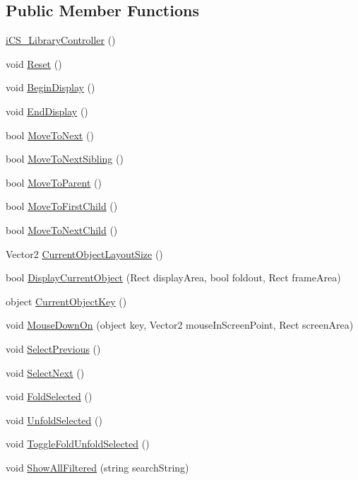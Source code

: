 \subsection*{Public Member Functions}
\begin{DoxyCompactItemize}
\item 
\hyperlink{classi_c_s___library_controller_a00da6c7ab6f2a2e741d7b258ddd9d4b6}{i\+C\+S\+\_\+\+Library\+Controller} ()
\item 
void \hyperlink{classi_c_s___library_controller_a7450cfa9b99a6c2605064bc7cee26162}{Reset} ()
\item 
void \hyperlink{classi_c_s___library_controller_a666e04cf052869d6ab4dcb694e9d44dd}{Begin\+Display} ()
\item 
void \hyperlink{classi_c_s___library_controller_a9ad11c8d17c8256b178e5da1e4976fd0}{End\+Display} ()
\item 
bool \hyperlink{classi_c_s___library_controller_a66518bd726d77eb95da89ca054d4592a}{Move\+To\+Next} ()
\item 
bool \hyperlink{classi_c_s___library_controller_a2bcdf537cc4bf8c2a039c1f13679ea23}{Move\+To\+Next\+Sibling} ()
\item 
bool \hyperlink{classi_c_s___library_controller_a6da18b820d4785958bdf5b0e153698f5}{Move\+To\+Parent} ()
\item 
bool \hyperlink{classi_c_s___library_controller_a5e6a28b5dfc2a6da43e2e6b610bf75d0}{Move\+To\+First\+Child} ()
\item 
bool \hyperlink{classi_c_s___library_controller_abdb2b05959e9863e641618deded82e29}{Move\+To\+Next\+Child} ()
\item 
Vector2 \hyperlink{classi_c_s___library_controller_a0fba8316f8b01245ff5da6a2a89d9d4a}{Current\+Object\+Layout\+Size} ()
\item 
bool \hyperlink{classi_c_s___library_controller_a7a9c8600c6e69791b00a88347cd6858d}{Display\+Current\+Object} (Rect display\+Area, bool foldout, Rect frame\+Area)
\item 
object \hyperlink{classi_c_s___library_controller_a89ad40001e2d1035ef6a11851b5f369b}{Current\+Object\+Key} ()
\item 
void \hyperlink{classi_c_s___library_controller_a927fb80ad75c3c575344554d8ed95dfd}{Mouse\+Down\+On} (object key, Vector2 mouse\+In\+Screen\+Point, Rect screen\+Area)
\item 
void \hyperlink{classi_c_s___library_controller_aa50c2beccf22bff7962ca226298372dd}{Select\+Previous} ()
\item 
void \hyperlink{classi_c_s___library_controller_a0877838867e1ca156fb2c4c01c976670}{Select\+Next} ()
\item 
void \hyperlink{classi_c_s___library_controller_aa0ed111697f3bf37fb0820eedfdc1398}{Fold\+Selected} ()
\item 
void \hyperlink{classi_c_s___library_controller_a31d71b87e71815e8655b288295aba01b}{Unfold\+Selected} ()
\item 
void \hyperlink{classi_c_s___library_controller_a3be4d87ed5cc5e0c722717c792ef4b55}{Toggle\+Fold\+Unfold\+Selected} ()
\item 
void \hyperlink{classi_c_s___library_controller_a8977805fb7d120fd45400c3561e210fb}{Show\+All\+Filtered} (string search\+String)
\end{DoxyCompactItemize}
